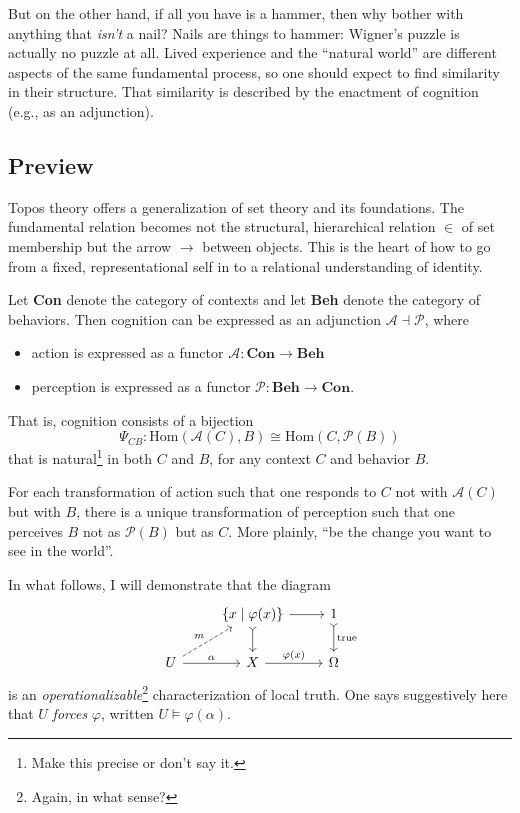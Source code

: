 \documentclass{article}
\begin{document}
But on the other hand, if all you have is a hammer, then why bother with anything that \emph{isn't} a nail? Nails are things to hammer: Wigner's puzzle is actually no puzzle at all. Lived experience and the ``natural world'' are different aspects of the same fundamental process, so one should expect to find similarity in their structure. That similarity is described by the enactment of cognition (e.g., as an adjunction).

\subsection{Preview}

Topos theory offers a generalization of set theory and its foundations. The fundamental relation becomes not the structural, hierarchical relation $\in$ of set membership but the arrow $\to$ between objects. This is the heart of how to go from a fixed, representational self in to a relational understanding of identity.

Let \textbf{Con} denote the category of contexts and let \textbf{Beh} denote the category of behaviors. Then cognition can be expressed as an adjunction $\mathcal{A} \dashv \mathcal{P}$, where

\begin{itemize}
    \item action is expressed as a functor $\mathcal{A} \colon \textbf{Con} \to \textbf{Beh}$
    \item perception is expressed as a functor $\mathcal{P} \colon \textbf{Beh} \to \textbf{Con}$.
\end{itemize}

That is, cognition consists of a bijection
\[
    \Psi_{CB} \colon \text{Hom} ( \mathcal{A}(C), B ) \cong \text{Hom}(C, \mathcal{P}(B))
\]
that is natural\footnote{Make this precise or don't say it.} in both $C$ and $B$, for any context $C$ and behavior $B$.

For each transformation of action such that one responds to $C$ not with $\mathcal{A}(C)$ but with $B$, there is a unique transformation of perception such that one perceives $B$ not as $\mathcal{P}(B)$ but as $C$. More plainly, ``be the change you want to see in the world''.

In what follows, I will demonstrate that the diagram
\[
    \begin{tikzcd}
        & \{ x \mid \varphi(x) \}  \arrow[r] \arrow[d, tail] & 1 \arrow[d, tail, "\text{true}"] \\
        U \arrow[r, "\alpha"] \arrow[ru, dashed, "m"] & X \arrow[r, "\varphi(x)"] & \Omega
    \end{tikzcd}
\]
is an \emph{operationalizable}\footnote{Again, in what sense?} characterization of local truth. One says suggestively here that $U$ \emph{forces} $\varphi$, written $U \vDash \varphi(\alpha)$.
\end{document}
